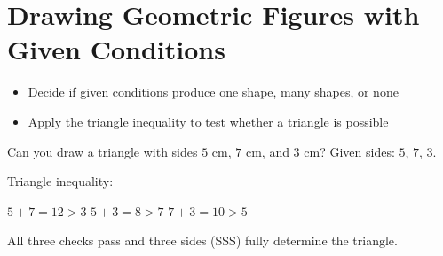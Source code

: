 \section{Drawing Geometric Figures with Given Conditions}

\begin{stepGoal}
\begin{itemize}
    \item Decide if given conditions produce one shape, many shapes, or none
    \item Apply the triangle inequality to test whether a triangle is possible
\end{itemize}
\end{stepGoal}

\begin{stepVocabBox}
\end{stepVocabBox}

\begin{stepsCard}
\end{stepsCard}

\begin{stepExample}{Can you draw a triangle with sides $5$ cm, $7$ cm, and $3$ cm?}
     Given sides: $5$, $7$, $3$.

     Triangle inequality:\par
    $5 + 7 = 12 > 3$ \checkmark \quad $5 + 3 = 8 > 7$ \checkmark \quad $7 + 3 = 10 > 5$ \checkmark

     All three checks pass and three sides (SSS) fully determine the triangle.
\end{stepExample}

